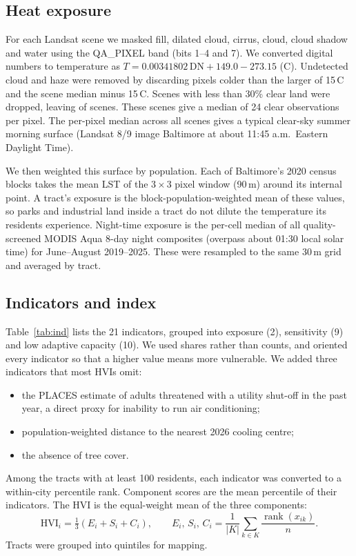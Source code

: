 \documentclass[11pt]{article}
\newcommand{\degC}{\,\textdegree C}
\begin{document}
\subsection{Heat exposure}
For each Landsat scene we masked fill, dilated cloud, cirrus, cloud, cloud shadow and water using the QA\_PIXEL band (bits 1--4 and 7). We converted digital numbers to temperature as $T = 0.00341802\,\mathrm{DN} + 149.0 - 273.15$ (\textdegree C). Undetected cloud and haze were removed by discarding pixels colder than the larger of 15\degC{} and the scene median minus 15\degC. Scenes with less than 30\% clear land were dropped, leaving \NScenesUsed{} of \NScenes{} scenes. These scenes give a median of 24 clear observations per pixel. The per-pixel median across all scenes gives a typical clear-sky summer morning surface (Landsat 8/9 image Baltimore at about 11:45 a.m.\ Eastern Daylight Time).

We then weighted this surface by population. Each of Baltimore's 2020 census blocks takes the mean LST of the $3\times3$ pixel window (90\,m) around its internal point. A tract's exposure is the block-population-weighted mean of these values, so parks and industrial land inside a tract do not dilute the temperature its residents experience. Night-time exposure is the per-cell median of all quality-screened MODIS Aqua 8-day night composites (overpass about 01:30 local solar time) for June--August 2019--2025. These were resampled to the same 30\,m grid and averaged by tract.

\subsection{Indicators and index}
Table~\ref{tab:ind} lists the 21 indicators, grouped into exposure (2), sensitivity (9) and low adaptive capacity (10). We used shares rather than counts, and oriented every indicator so that a higher value means more vulnerable. We added three indicators that most HVIs omit:
\begin{itemize}
  \item the PLACES estimate of adults threatened with a utility shut-off in the past year, a direct proxy for inability to run air conditioning;
  \item population-weighted distance to the nearest 2026 cooling centre;
  \item the absence of tree cover.
\end{itemize}
Among the \NScored{} tracts with at least 100 residents, each indicator was converted to a within-city percentile rank. Component scores are the mean percentile of their indicators. The HVI is the equal-weight mean of the three components:
\begin{equation}
\mathrm{HVI}_i = \tfrac13\left(E_i + S_i + C_i\right), \qquad E_i,\,S_i,\,C_i = \frac{1}{|K|}\sum_{k\in K} \frac{\operatorname{rank}(x_{ik})}{n}.
\end{equation}
Tracts were grouped into quintiles for mapping.
\end{document}
